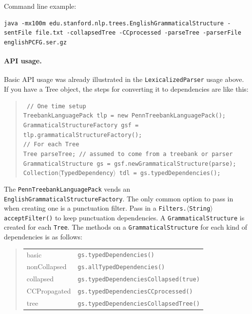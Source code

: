 \documentclass[11pt,letter]{article}
\begin{document}
\bigskip

\noindent Command line example:\\
{\hangindent=0.5in\raggedright\texttt{java -mx100m edu.stanford.nlp.trees.EnglishGrammaticalStructure -sentFile file.txt -collapsedTree -CCprocessed -parseTree -parserFile englishPCFG.ser.gz}\\}

\paragraph{API usage.} Basic API usage was already
illustrated in the \texttt{LexicalizedParser} usage above.  If you
have a Tree object, the steps for converting it to dependencies are
like this:
\begin{quote}
\texttt{
// One time setup \\
TreebankLanguagePack tlp = new PennTreebankLanguagePack(); \\
GrammaticalStructureFactory gsf = tlp.grammaticalStructureFactory(); \\
// For each Tree \\
Tree parseTree; // assumed to come from a treebank or parser \\
GrammaticalStructure gs = gsf.newGrammaticalStructure(parse); \\
Collection$\langle$TypedDependency$\rangle$ tdl = gs.typedDependencies();
}
\end{quote}
The \texttt{PennTreebankLanguagePack} vends an
\texttt{EnglishGrammaticalStructureFactory}. The only common option
to pass in when creating one is a punctuation filter. Pass in a
\texttt{Filters.$\langle$String$\rangle$\discretionary{}{}{}acceptFilter()} to keep
punctuation dependencies. A \texttt{GrammaticalStructure} is created
for each \texttt{Tree}. The methods on a \texttt{GrammaticalStructure}
for each kind of dependencies is as follows:
\begin{quote}
\begin{tabular}{ll}
basic & \texttt{gs.typedDependencies()} \\
nonCollapsed & \texttt{gs.allTypedDependencies()} \\
collapsed & \texttt{gs.typedDependenciesCollapsed(true)} \\
CCPropagated & \texttt{gs.typedDependenciesCCprocessed()} \\
tree & \texttt{gs.typedDependenciesCollapsedTree()} \\
\end{tabular}
\end{quote}
\end{document}

